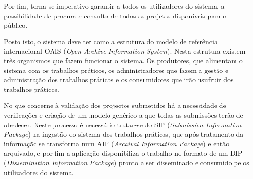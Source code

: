  Por fim, torna-se imperativo garantir a todos os utilizadores do sistema, a possibilidade de procura
 e consulta de todos os projetos disponíveis para o público.
 
 Posto isto, o sistema deve ter como a estrutura do modelo de referência internacional OAIS 
 (\textit{Open Archive Information System}).
 Nesta estrutura existem três organismos que fazem funcionar o sistema. Os produtores, que 
 alimentam o sistema com os trabalhos práticos, os administradores que fazem a gestão e administração
 dos trabalhos práticos e os consumidores que irão usufruir dos trabalhos práticos. 
 
No que concerne à validação dos projectos submetidos há a necessidade de verificações e 
criação de um modelo genérico a que todas as submissões terão de obedecer. Neste processo
é necessário tratar-se do SIP (\textit{Submission Information Package}) na ingestão do sistema dos
trabalhos práticos, que após tratamento da informação se transforma num AIP (\textit{Archival 
Information Package}) e então arquivado, e por fim a aplicação disponibiliza o trabalho no formato
de um DIP (\textit{Dissemination Information Package}) pronto a ser disseminado e consumido pelos
utilizadores do sistema.

\newpage